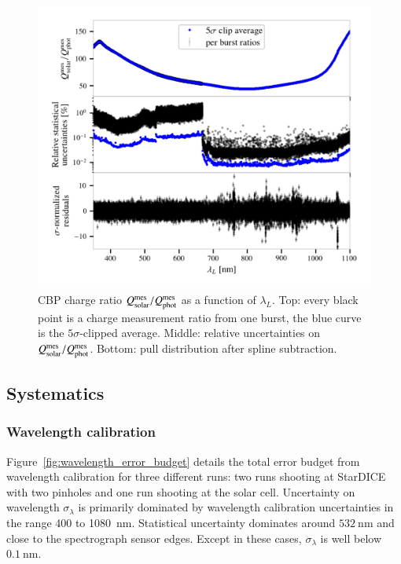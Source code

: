 \begin{figure}[!h]
\centering
\includegraphics[width=\columnwidth]{fig/cbp_charge_ratio.png}
\caption{CBP charge ratio $Q_{\mathrm{solar}}^{\mathrm{mes}}/Q_{\mathrm{phot}}^{\mathrm{mes}}$ as a function of $\lambda_L$. Top: every black point is a charge measurement ratio from one burst, the blue curve is the $5\sigma$-clipped average. Middle: relative uncertainties on $Q_{\mathrm{solar}}^{\mathrm{mes}}/Q_{\mathrm{phot}}^{\mathrm{mes}}$. Bottom: pull distribution after spline subtraction.}\label{fig:cbp_charge_ratio}
\end{figure}


\subsection{Systematics}



\subsubsection{Wavelength calibration}\label{sec:wavelength_syst}


Figure~\ref{fig:wavelength_error_budget} details the total error budget from wavelength calibration for three different runs: two runs shooting at StarDICE with two pinholes and one run shooting at the solar cell. Uncertainty on wavelength $\sigma_\lambda$ is primarily dominated by wavelength calibration uncertainties in the range 400 to \SI{1080}{\nm}. Statistical uncertainty dominates around $\SI{532}{\nm}$ and close to the spectrograph sensor edges. Except in these cases, $\sigma_\lambda$ is well below $\SI{0.1}{\nano\meter}$.%

